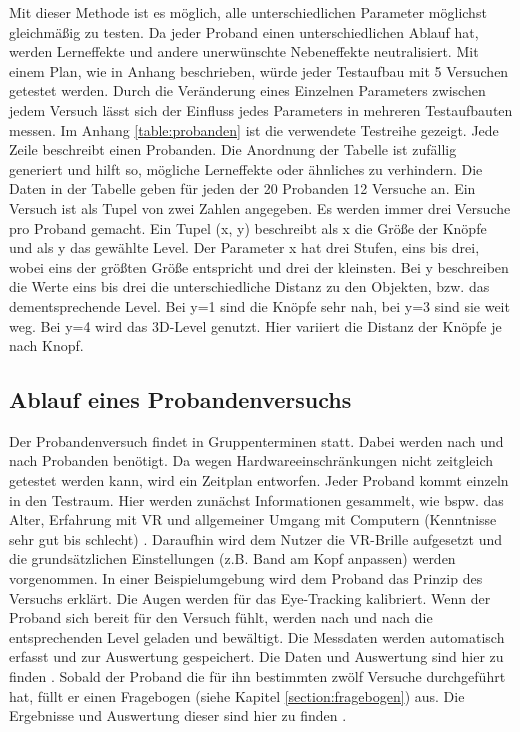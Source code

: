 Mit dieser Methode ist es möglich, alle unterschiedlichen Parameter möglichst gleichmäßig zu testen. Da jeder Proband einen unterschiedlichen Ablauf hat, werden Lerneffekte und andere unerwünschte Nebeneffekte neutralisiert. Mit einem Plan, wie in Anhang  beschrieben, würde jeder Testaufbau mit 5 Versuchen getestet werden. Durch die Veränderung eines Einzelnen Parameters zwischen jedem Versuch lässt sich der Einfluss jedes Parameters in mehreren Testaufbauten messen. Im Anhang \ref{table:probanden} ist die verwendete Testreihe gezeigt. Jede Zeile beschreibt einen Probanden. Die Anordnung der Tabelle ist zufällig generiert und hilft so, mögliche Lerneffekte oder ähnliches zu verhindern. Die Daten in der Tabelle geben für jeden der 20 Probanden 12 Versuche an. Ein Versuch ist als Tupel von zwei Zahlen angegeben. Es werden immer drei Versuche pro Proband gemacht. Ein Tupel (x, y) beschreibt als x die Größe der Knöpfe und als y das gewählte Level. Der Parameter x hat drei Stufen, eins bis drei, wobei eins der größten Größe entspricht und drei der kleinsten. Bei y beschreiben die Werte eins bis drei die unterschiedliche Distanz zu den Objekten, bzw. das dementsprechende Level. Bei y=1 sind die Knöpfe sehr nah, bei y=3 sind sie weit weg. Bei y=4 wird das 3D-Level genutzt. Hier variiert die Distanz der Knöpfe je nach Knopf. 

\subsection{Ablauf eines Probandenversuchs}
Der Probandenversuch findet in Gruppenterminen statt. Dabei werden nach und nach Probanden benötigt. Da wegen Hardwareeinschränkungen nicht zeitgleich getestet werden kann, wird ein Zeitplan entworfen. Jeder Proband kommt einzeln in den Testraum. Hier werden zunächst Informationen gesammelt, wie bspw. das Alter, Erfahrung mit VR und allgemeiner Umgang mit Computern (Kenntnisse sehr gut bis schlecht) . Daraufhin wird dem Nutzer die VR-Brille aufgesetzt und die grundsätzlichen Einstellungen (z.B. Band am Kopf anpassen) werden vorgenommen. In einer Beispielumgebung wird dem Proband das Prinzip des Versuchs erklärt. Die Augen werden für das Eye-Tracking kalibriert. Wenn der Proband sich bereit für den Versuch fühlt, werden nach und nach die entsprechenden Level geladen und bewältigt. Die Messdaten werden automatisch erfasst und zur Auswertung gespeichert. Die Daten und Auswertung sind hier zu finden . Sobald der Proband die für ihn bestimmten zwölf Versuche durchgeführt hat, füllt er einen Fragebogen (siehe Kapitel \ref{section:fragebogen}) aus. Die Ergebnisse und Auswertung dieser sind hier zu finden .

